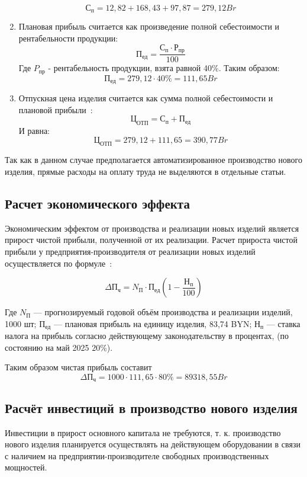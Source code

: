 \begin{enumerate}
$$С_п = 12,82 + 168,43 + 97,87 = 279,12 Br$$ 

\item Плановая прибыль считается как произведение полной себестоимости и рентабельности продукции:
  \begin{equation}
    П_{ед}= \frac{С_п \cdot Р_{пр}}{100}
  \end{equation}
  Где  $P_{пр}$ - рентабельность продукции, взята равной 40\%.
  Таким образом:
$$ П_{ед} = 279,12 \cdot 40\% = 111,65 Br$$

\item Отпускная цена изделия считается как сумма полной себестоимости
  и плановой прибыли~\cite{bsuir-project-economics}:
  \begin{equation}
    Ц_{ОТП}=С_п+П_{ед}
  \end{equation}
  И равна: $$Ц_{ОТП}=279,12+111,65= 390,77Br$$ 
\end{enumerate}

Так как в данном случае предполагается автоматизированное производство
нового изделия, прямые расходы на оплату труда не выделяются в
отдельные статьи.

\subsection{Расчет экономического эффекта}

Экономическим эффектом от производства и реализации новых изделий
является прирост чистой прибыли, полученной от их реализации.  Расчет
прироста чистой прибыли у предприятия-производителя от реализации
новых изделий осуществляется по
формуле~\cite{bsuir-project-economics}:

\begin{equation}
  \Delta П_ч=N_П \cdot П_{ед} ( 1- \frac{Н_п}{100} )
\end{equation}

Где $N_П$ — прогнозируемый годовой объём производства и реализации изделий, 1000 шт;
$П_{ед}$ — плановая прибыль на единицу изделия, 83,74 BYN;
$Н_п$ — ставка налога на прибыль согласно действующему законодательству в процентах,
(по состоянию на май 2025 20\%).

Таким образом чистая прибыль составит
$$  \Delta П_ч = 1000 \cdot 111,65 \cdot 80\% = 89 318,55Br$$


\subsection{Расчёт инвестиций в производство нового изделия}
Инвестиции в прирост основного капитала не требуются,
т. к. производство нового изделия планируется осуществлять на
действующем оборудовании в связи с наличием на
предприятии-производителе свободных производственных мощностей.

